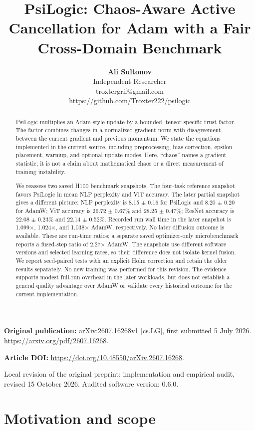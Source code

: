 \documentclass[11pt,a4paper]{article}
\title{PsiLogic: Chaos-Aware Active Cancellation for Adam with a Fair Cross-Domain Benchmark}
\author{\textbf{Ali Sultonov}\\Independent Researcher\\troxtergrif@gmail.com\\\url{https://github.com/Troxter222/psilogic}}
\date{}
\begin{document}
\maketitle
\textbf{Original publication:} arXiv:2607.16268v1 [cs.LG], first submitted 5 July 2026. \url{https://arxiv.org/pdf/2607.16268}.

\textbf{Article DOI:} \url{https://doi.org/10.48550/arXiv.2607.16268}.

Local revision of the original preprint: implementation and empirical audit, revised 15 October 2026. Audited software version: 0.6.0.

\begin{abstract}

PsiLogic multiplies an Adam-style update by a bounded, tensor-specific trust factor. The factor combines changes in a normalized gradient norm with disagreement between the current gradient and previous momentum. We state the equations implemented in the current source, including preprocessing, bias correction, epsilon placement, warmup, and optional update modes. Here, ``chaos'' names a gradient statistic; it is not a claim about mathematical chaos or a direct measurement of training instability.

We reassess two saved H100 benchmark snapshots. The four-task reference snapshot favors PsiLogic in mean NLP perplexity and ViT accuracy. The later partial snapshot gives a different picture: NLP perplexity is 8.15 \(\pm\) 0.16 for PsiLogic and 8.20 \(\pm\) 0.20 for AdamW; ViT accuracy is 26.72 \(\pm\) 0.67\% and 28.25 \(\pm\) 0.47\%; ResNet accuracy is 22.08 \(\pm\) 0.23\% and 22.14 \(\pm\) 0.52\%. Recorded run wall time in the later snapshot is 1.099\(\times\), 1.024\(\times\), and 1.038\(\times\) AdamW, respectively. No later diffusion outcome is available. These are run-time ratios; a separate saved optimizer-only microbenchmark reports a fused-step ratio of 2.27\(\times\) AdamW. The snapshots use different software versions and selected learning rates, so their difference does not isolate kernel fusion. We report seed-paired tests with an explicit Holm correction and retain the older results separately. No new training was performed for this revision. The evidence supports modest full-run overhead in the later workloads, but does not establish a general quality advantage over AdamW or validate every historical outcome for the current implementation.

\end{abstract}

\section{Motivation and scope}
\end{document}
